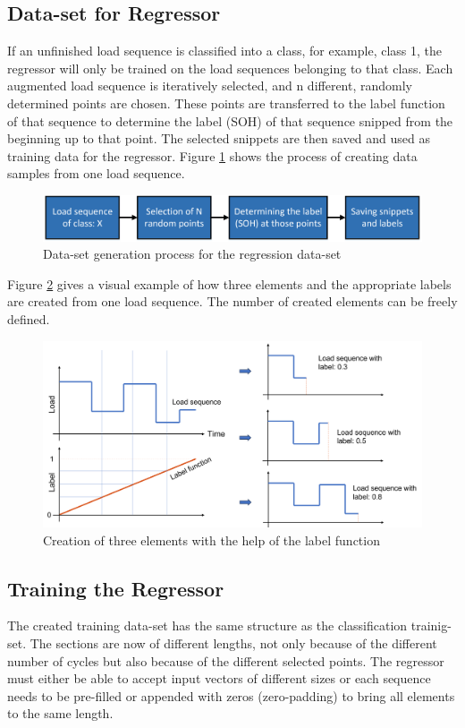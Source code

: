 \subsection{Data-set for Regressor}\label{PrRe}
If an unfinished load sequence is classified into a class, for example, class 1, the regressor will only be trained on the load sequences belonging to that class. Each augmented load sequence is iteratively selected, and n different, randomly determined points are chosen. These points are transferred to the label function of that sequence to determine the label (SOH) of that sequence snipped from the beginning up to that point. The selected snippets are then saved and used as training data for the regressor. 
Figure \ref{fig:dataregressor} shows the process of creating data samples from one load sequence.

\begin{figure}[H]
	\centering
	\includegraphics[width=0.85\linewidth]{IMGs/dataregressor.png}
	\caption{Data-set generation process for the regression data-set}
	\label{fig:dataregressor}
\end{figure}

Figure \ref{fig:4elems} gives a visual example of how three elements and the appropriate labels are created from one load sequence. The number of created elements can be freely defined.

\begin{figure}[H]
	\centering
	\includegraphics[width=1\linewidth]{IMGs/4elems.png}
	\caption{Creation of three elements with the help of the label function}
	\label{fig:4elems}
\end{figure}
\subsection{Training the Regressor}
The created training data-set has the same structure as the classification trainig-set. The sections are now of different lengths, not only because of the different number of cycles but also because of the different selected points. The regressor must either be able to accept input vectors of different sizes or each sequence needs to be pre-filled or appended with zeros (zero-padding) to bring all elements to the same length.
